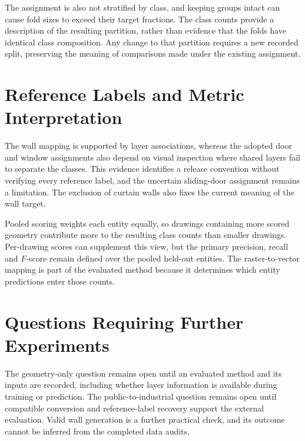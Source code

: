 The assignment is also not stratified by class, and keeping groups intact can
cause fold sizes to exceed their target fractions.
The class counts provide a description of the resulting partition, rather than
evidence that the folds have identical class composition.
Any change to that partition requires a new recorded split, preserving the
meaning of comparisons made under the existing assignment.

\section{Reference Labels and Metric Interpretation}
\label{sec:label-metric-limitations}
The wall mapping is supported by layer associations, whereas the adopted door
and window assignments also depend on visual inspection where shared layers fail
to separate the classes.
This evidence identifies a release convention without verifying every reference
label, and the uncertain sliding-door assignment remains a limitation.
The exclusion of curtain walls also fixes the current meaning of the wall target.

Pooled scoring weights each entity equally, so drawings containing more scored
geometry contribute more to the resulting class counts than smaller drawings.
Per-drawing scores can supplement this view, but the primary precision, recall
and \(F\)-score remain defined over the pooled held-out entities.
The raster-to-vector mapping is part of the evaluated method because it determines
which entity predictions enter those counts.

\section{Questions Requiring Further Experiments}
\label{sec:remaining-evidence}
The geometry-only question remains open until an evaluated method and its inputs
are recorded, including whether layer information is available during training
or prediction.
The public-to-industrial question remains open until compatible conversion and
reference-label recovery support the external evaluation.
Valid wall generation is a further practical check, and its outcome cannot be
inferred from the completed data audits.

